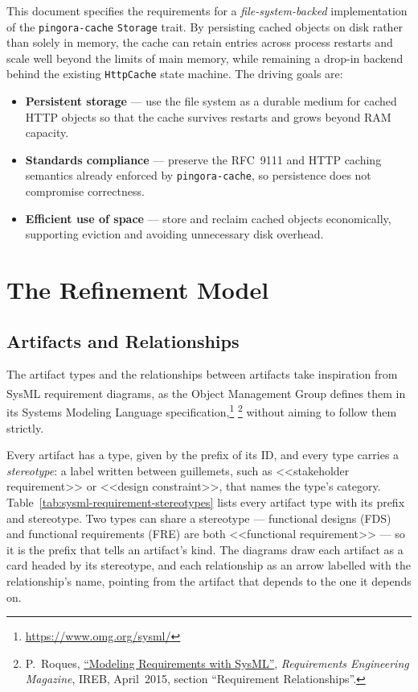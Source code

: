 This document specifies the requirements for a \emph{file-system-backed}
implementation of the \texttt{pingora-cache} \texttt{Storage} trait. By
persisting cached objects on disk rather than solely in memory, the cache can
retain entries across process restarts and scale well beyond the limits of
main memory, while remaining a drop-in backend behind the existing
\texttt{HttpCache} state machine. The driving goals are:

\begin{itemize}
    \item \textbf{Persistent storage} --- use the file system as a durable
          medium for cached HTTP objects so that the cache survives restarts
          and grows beyond RAM capacity.
    \item \textbf{Standards compliance} --- preserve the RFC~9111 and HTTP
          caching semantics already enforced by \texttt{pingora-cache}, so
          persistence does not compromise correctness.
    \item \textbf{Efficient use of space} --- store and reclaim cached objects
          economically, supporting eviction and avoiding unnecessary disk
          overhead.
\end{itemize}

\section{The Refinement Model}

\subsection*{Artifacts and Relationships}\label{sec:artifacts}

The artifact types and the relationships between artifacts take inspiration
from SysML\textsuperscript{\textregistered} requirement diagrams, as the
Object Management Group\textsuperscript{\textregistered} defines them in its
Systems Modeling Language\texttrademark{}
specification,\footnote{\url{https://www.omg.org/sysml/}}%
\footnote{P.~Roques,
\href{https://re-magazine.ireb.org/articles/modeling-requirements-with-sysml}{``Modeling
Requirements with SysML''}, \emph{Requirements Engineering Magazine}, IREB,
April~2015, section ``Requirement Relationships''.}
without aiming to follow them strictly.

Every artifact has a type, given by the prefix of its ID, and every type carries
a \emph{stereotype}: a label written between guillemets, such as
<<stakeholder requirement>> or <<design constraint>>, that names the type's
category. Table~\ref{tab:sysml-requirement-stereotypes} lists every artifact
type with its prefix and stereotype. Two types
can share a stereotype --- functional designs (\textsf{FDS}) and functional
requirements (\textsf{FRE}) are both <<functional requirement>> --- so it is the
prefix that tells an artifact's kind. The diagrams draw each artifact as a card
headed by its stereotype, and each relationship as an arrow labelled with the
relationship's name, pointing from the artifact that depends to the one it
depends on.

